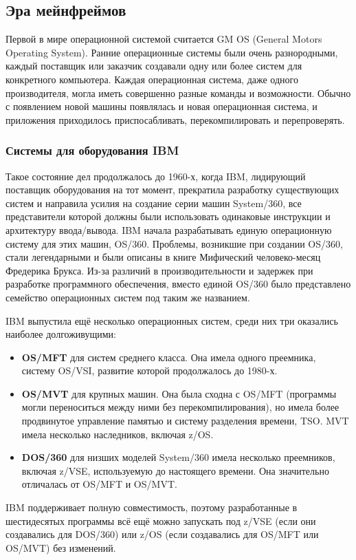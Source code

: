 \subsection{Эра мейнфреймов}
Первой в мире операционной системой считается GM OS (General Motors Operating System).
Ранние операционные системы были очень разнородными, каждый поставщик или заказчик создавали одну или более систем для конкретного компьютера. Каждая операционная система, даже одного производителя, могла иметь совершенно разные команды и возможности. Обычно с появлением новой машины появлялась и новая операционная система, и приложения приходилось приспосабливать, перекомпилировать и перепроверять.

\subsubsection{Системы для оборудования IBM}
Такое состояние дел продолжалось до 1960-х, когда IBM, лидирующий поставщик оборудования на тот момент, прекратила разработку существующих систем и направила усилия на создание серии машин System/360, все представители которой должны были использовать одинаковые инструкции и архитектуру ввода/вывода. IBM начала разрабатывать единую операционную систему для этих машин, OS/360. Проблемы, возникшие при создании OS/360, стали легендарными и были описаны в книге Мифический человеко-месяц Фредерика Брукса. Из-за различий в производительности и задержек при разработке программного обеспечения, вместо единой OS/360 было представлено семейство операционных систем под таким же названием.

IBM выпустила ещё несколько операционных систем, среди них три оказались наиболее долгоживущими:
\begin{itemize}
 \item \textbf{OS/MFT} для систем среднего класса. Она имела одного преемника, систему OS/VSI, развитие которой продолжалось до 1980-х.
 \item \textbf{OS/MVT} для крупных машин. Она была сходна с OS/MFT (программы могли переноситься между ними без перекомпилирования), но имела более продвинутое управление памятью и систему разделения времени, TSO. MVT имела несколько наследников, включая z/OS.
 \item \textbf{DOS/360} для низших моделей System/360 имела несколько преемников, включая z/VSE, используемую до настоящего времени. Она значительно отличалась от OS/MFT и OS/MVT.
\end{itemize}

IBM поддерживает полную совместимость, поэтому разработанные в шестидесятых программы всё ещё можно запускать под z/VSE (если они создавались для DOS/360) или z/OS (если создавались для OS/MFT или OS/MVT) без изменений.

